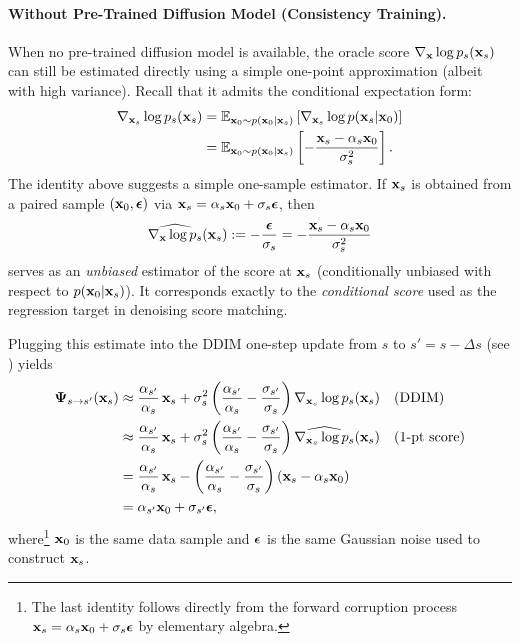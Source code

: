     
\paragraph{Without Pre-Trained Diffusion Model (Consistency Training).}
When no pre-trained diffusion model is available, the oracle score $\nabla_{{\mathbf{x}}}\log p_s({\mathbf{x}}_s)$ can still be estimated directly using a simple one-point approximation (albeit with high variance). 
Recall that it admits the conditional expectation form:
\begin{align*}
    \nabla_{{\mathbf{x}}_s} \log p_s({\mathbf{x}}_s)
    &= \mathbb{E}_{{\mathbf{x}}_0 \sim p({\mathbf{x}}_0|{\mathbf{x}}_s)} \left[ \nabla_{{\mathbf{x}}_s}\log p({\mathbf{x}}_s|{\mathbf{x}}_0) \right] \\
    &= \mathbb{E}_{{\mathbf{x}}_0 \sim p({\mathbf{x}}_0|{\mathbf{x}}_s)} \left[ -\frac{{\mathbf{x}}_s - \alpha_s {\mathbf{x}}_0}{\sigma_s^2} \right].
\end{align*}
The identity above suggests a simple one-sample estimator. 
If ${\mathbf{x}}_s$ is obtained from a paired sample $({\mathbf{x}}_0,{\bm{\epsilon}})$ via ${\mathbf{x}}_s = \alpha_s {\mathbf{x}}_0 + \sigma_s {\bm{\epsilon}}$, then 
\[
\widehat{\nabla_{{\mathbf{x}}}\log p_s}({\mathbf{x}}_s)
:=-\frac{\boldsymbol\epsilon}{\sigma_s}
=-\frac{{\mathbf{x}}_s-\alpha_s {\mathbf{x}}_0}{\sigma_s^2}
\]
serves as an \emph{unbiased} estimator of the score at ${\mathbf{x}}_s$ (conditionally unbiased with respect to $p({\mathbf{x}}_0|{\mathbf{x}}_s)$). It corresponds exactly to the \emph{conditional score} used as the regression target in denoising score matching.



Plugging this estimate into the DDIM one-step update from $s$ to $s' = s-\Delta s$ (see ) yields
\begin{align}\label{eq:one-pt-score}
\begin{aligned}
    {\bm{\Psi}}_{s\to s'}({\mathbf{x}}_s)
&\approx
\frac{\alpha_{s'}}{\alpha_s}\,{\mathbf{x}}_s 
+ \sigma_s^2 \left(\frac{\alpha_{s'}}{\alpha_s}-\frac{\sigma_{s'}}{\sigma_s}\right)\nabla_{{\mathbf{x}}_s}\log p_s({\mathbf{x}}_s) && \text{(DDIM)}
\\
&\approx
\frac{\alpha_{s'}}{\alpha_s}\,{\mathbf{x}}_s 
+ \sigma_s^2 \left(\frac{\alpha_{s'}}{\alpha_s}-\frac{\sigma_{s'}}{\sigma_s}\right)\widehat{\nabla_{{\mathbf{x}}_s}\log p_s}({\mathbf{x}}_s) && \text{(1-pt score)}
\\
&=
\frac{\alpha_{s'}}{\alpha_s}\,{\mathbf{x}}_s 
-\left(\frac{\alpha_{s'}}{\alpha_s}-\frac{\sigma_{s'}}{\sigma_s}\right)({\mathbf{x}}_s-\alpha_s{\mathbf{x}}_0)
\\
&= \alpha_{s'}{\mathbf{x}}_0+\sigma_{s'}{\bm{\epsilon}}, 
\end{aligned}
\end{align}
where\footnote{The last identity follows directly from the forward corruption process ${\mathbf{x}}_s=\alpha_s {\mathbf{x}}_0+\sigma_s {\bm{\epsilon}}$ by elementary algebra.}
${\mathbf{x}}_0$ is the same data sample and ${\bm{\epsilon}}$ is the same Gaussian noise used to
construct ${\mathbf{x}}_s$.


